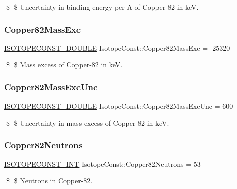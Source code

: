\$ \$ Uncertainty in binding energy per A of Copper-\/82 in keV. \mbox{\label{group___isotope_const-_copper-_cu82_gad3d82810f51f3d0fb63e365e4d2234f7}} 
\subsubsection{\texorpdfstring{Copper82\+Mass\+Exc}{Copper82MassExc}}
{\footnotesize\ttfamily \mbox{\hyperlink{group___isotope_const-_macros_ga8f45a7272ce02c0b4c65c44636ed719a}{I\+S\+O\+T\+O\+P\+E\+C\+O\+N\+S\+T\+\_\+\+D\+O\+U\+B\+LE}} Isotope\+Const\+::\+Copper82\+Mass\+Exc = -\/25320}

\$ \$ Mass excess of Copper-\/82 in keV. \mbox{\label{group___isotope_const-_copper-_cu82_ga4c34126c17f808babfbd3f2adafbff74}} 
\subsubsection{\texorpdfstring{Copper82\+Mass\+Exc\+Unc}{Copper82MassExcUnc}}
{\footnotesize\ttfamily \mbox{\hyperlink{group___isotope_const-_macros_ga8f45a7272ce02c0b4c65c44636ed719a}{I\+S\+O\+T\+O\+P\+E\+C\+O\+N\+S\+T\+\_\+\+D\+O\+U\+B\+LE}} Isotope\+Const\+::\+Copper82\+Mass\+Exc\+Unc = 600}

\$ \$ Uncertainty in mass excess of Copper-\/82 in keV. \mbox{\label{group___isotope_const-_copper-_cu82_ga357e56fadf7d85a80e4130943870f267}} 
\subsubsection{\texorpdfstring{Copper82\+Neutrons}{Copper82Neutrons}}
{\footnotesize\ttfamily \mbox{\hyperlink{group___isotope_const-_macros_ga5f18360b3e99483a35c32d789e62621c}{I\+S\+O\+T\+O\+P\+E\+C\+O\+N\+S\+T\+\_\+\+I\+NT}} Isotope\+Const\+::\+Copper82\+Neutrons = 53}

\$ \$ Neutrons in Copper-\/82. \mbox{\label{group___isotope_const-_copper-_cu82_ga74b5fa74f2a59a6c6d300122853dd0dc}} 
